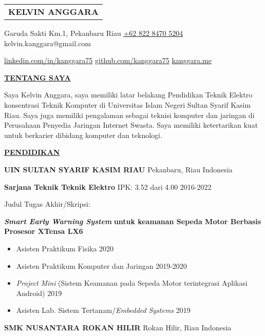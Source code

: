 \documentclass{scrbook}
\begin{document}
\begin{table}
\begin{tabularx}{\textwidth}{
p{}}
\centering\arraybackslash{}\textbf{KELVIN ANGGARA} \\
\end{tabularx}
\end{table}

\begin{center}Garuda Sakti Km.1, Pekanbaru Riau {\textbar} \href{https://wa.me/6282284705204}{+62 822 8470 5204} {\textbar} kelvin.kanggara@gmail.com
\end{center}


\begin{center}\href{https://linkedin.com/in/kanggara75}{linkedin.com/in/kanggara75} {\textbar} \href{https://github.com/kanggara75}{github.com/kanggara75} \foreignlanguage{english}{{\textbar}} \href{https://kanggara.me/}{kanggara.me}
\end{center}

\uppercase{\textbf{\uline{Tentang saya}}} 

Saya Kelvin Anggara, saya memiliki latar belakang Pendidikan Teknik Elektro konsentrasi Teknik Komputer di Universitas Islam Negeri Sultan Syarif Kasim Riau. Saya juga memiliki pengalaman sebagai teknisi komputer \foreignlanguage{english}{dan} jaringan di Perusahaan Penyedia Jaringan Internet Swasta. Saya memiliki ketertarikan kuat untuk berkarier dibidang komputer dan teknologi.

\uppercase{\textbf{\uline{Pendidikan}}} 

\textbf{UIN SULTAN SYARIF KASIM RIAU} Pekanbaru, Riau Indonesia

\textbf{Sarjana Teknik \textendash{} Teknik Elektro} \textendash{} IPK: 3.52 dari 4.00 2016-2022

Judul Tugas Akhir/Skripsi:

\textbf{\textit{Smart Early Warning System}} \textbf{untuk keamanan Sepeda Motor Berbasis Prosesor XTensa LX6}
\begin{itemize}
\item Asisten Praktikum Fisika 2020
\item Asisten Praktikum Komputer dan Jaringan 2019-2020
\item \textit{Project} \textit{Mini} (Sistem Keamanan pada Sepeda Motor terintegrasi Aplikasi Android) 2019
\item Asisten Lab. Sistem Tertanam/\textit{Embedded} \textit{Systems} 2019
\end{itemize}
\textbf{SMK NUSANTARA ROKAN HILIR} Rokan Hilir, Riau Indonesia 
\end{document}
